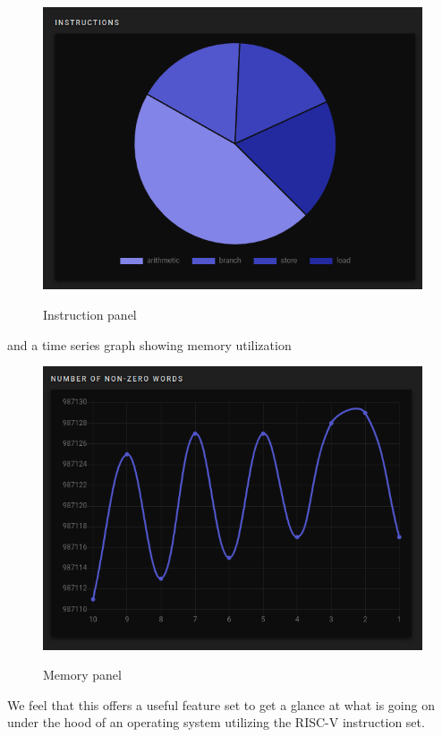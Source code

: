 \begin{figure}[H]
  \includegraphics[scale=.4]{inst}
  \label{fig:inst}
  \caption{Instruction panel}
  \centering
\end{figure}

\noindent
and a time series graph showing memory utilization

\begin{figure}[H]
  \includegraphics[scale=.4]{mem}
  \label{fig:mem}
  \caption{Memory panel}
  \centering
\end{figure}

\noindent
We feel that this offers a useful feature set to get a glance at what is going on under the hood
of an operating system utilizing the RISC-V instruction set.

